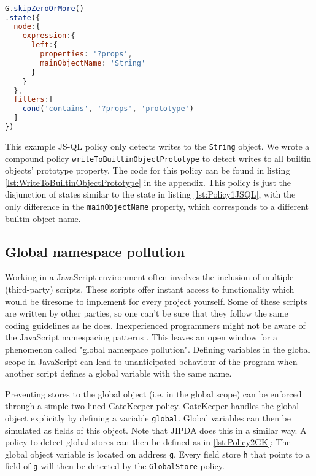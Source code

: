 \begin{lstlisting}[label={lst:Policy1JSQL},language=JavaScript,caption=Policy 1 in JS-QL,mathescape=true]  % float=t?

G.skipZeroOrMore()
.state({
  node:{
    expression:{
      left:{
        properties: '?props',
        mainObjectName: 'String'
      }
    }
  },
  filters:[
    cond('contains', '?props', 'prototype')
  ]
})

\end{lstlisting}

This example JS-QL policy only detects writes to the \texttt{String} object. We wrote a compound policy \texttt{writeToBuiltinObjectPrototype} to detect writes to all builtin objects' prototype property. The code for this policy can be found in listing \ref{lst:WriteToBuiltinObjectPrototype} in the appendix. This policy is just the disjunction of states similar to the state in listing \ref{lst:Policy1JSQL}, with the only difference in the \texttt{mainObjectName} property, which corresponds to a different builtin object name.

\subsection{Global namespace pollution}

Working in a JavaScript environment often involves the inclusion of multiple (third-party) scripts. These scripts offer instant access to functionality which would be tiresome to implement for every project yourself. Some of these scripts are written by other parties, so one can't be sure that they follow the same coding guidelines as he does. Inexperienced programmers might not be aware of the JavaScript namespacing patterns \cite{JSNamespacing}. This leaves an open window for a phenomenon called "global namespace pollution". Defining variables in the global scope in JavaScript can lead to unanticipated behaviour of the program when another script defines a global variable with the same name.

Preventing stores to the global object (i.e. in the global scope) can be enforced through a simple two-lined GateKeeper policy. GateKeeper handles the global object explicitly by defining a variable \texttt{global}. Global variables can then be simulated as fields of this object. Note that JIPDA does this in a similar way. A policy to detect global stores can then be defined as in \ref{lst:Policy2GK}: The global object variable is located on address \texttt{g}. Every field store \texttt{h} that points to a field of \texttt{g} will then be detected by the \texttt{GlobalStore} policy.


